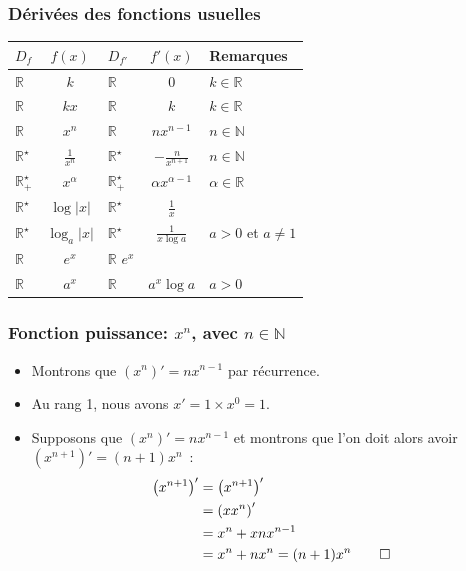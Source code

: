\documentclass[10pt,notheorems]{beamer}
\newcommand{\R}{{\mathbb R}}
\newcommand{\N}{{\mathbb N}}
\theoremstyle{plain}
\theoremstyle{definition} %
\begin{document}
\begin{frame}
  \frametitle{Dérivées des fonctions usuelles}
  \hypertarget{slide_derivee_usuelles}{}

  \bigskip
  \renewcommand{\arraystretch}{1.8}
  \begin{table}[H]
    \centering
    {\small
      \begin{tabular}{l|c|l|c|l}
        \hline
        $D_f$ & $f(x)$ & $D_{f'}$ & $f'(x)$ & Remarques\\ \hline
        $\R$ & $k$ & $\R$ & 0 & $k\in\R$\\
        $\R$ & $kx$ & $\R$ & $k$ & $k\in\R$\\
        $\R$ & $x^n$ & $\R$ & $nx^{n-1}$ & $n\in\N$\\
        $\R^{\star}$ & $\frac{1}{x^n}$ & $\R^{\star}$ & $-\frac{n}{x^{n+1}}$ & $n\in\N$\\
        $\R_+^\star$ & $x^{\alpha}$  & $\R_+^{\star}$ &  $\alpha x^{\alpha - 1}$ & $\alpha\in\R$\\
        $\R^\star$ & $\log |x|$ & $\R^\star$ & $\frac{1}{x}$ & \\
        $\R^\star$ & $\log_a |x|$ & $\R^\star$ & $\frac{1}{x \log a}$ & $a>0$ et $a\neq 1$\\
        $\R$ & $e^x$  & $\R$  $e^x$ & \\
        $\R$ & $a^x$ & $\R$ & $a^x \log a$ & $a > 0$ \\ \hline\hline
      \end{tabular}}
  \end{table}

\end{frame}


\begin{frame}
  \frametitle{Fonction puissance: $x^n$, avec $n\in\mathbb N$}

  \begin{itemize}

  \item Montrons que $\left(x^n\right)' = nx^{n-1}$ par récurrence.\newline

  \item Au rang 1, nous avons $x' = 1\times x^0 = 1$.\newline

  \item Supposons que $\left(x^n\right)' = nx^{n-1}$ et montrons que l'on doit alors avoir $\left(x^{n+1}\right)' = (n+1)x^{n}$~:
    \[
      \begin{split}
        \left(x^{n+1}\right)' &= \left(x^{n+1}\right)'\\
        &=\left(xx^{n}\right)'\\
        &=x^n + x n x^{n-1}\\
        &=x^n + n x^{n} = (n+1)x^{n}\qed
      \end{split}
    \]

  \end{itemize}
\end{frame}
\end{document}
